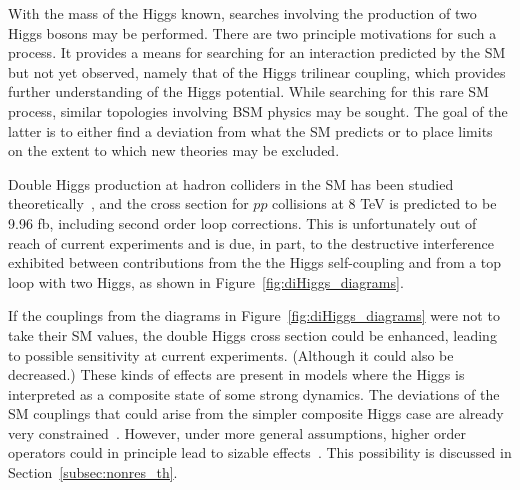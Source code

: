With the mass of the Higgs known, searches involving the production of two Higgs bosons may
be performed. There are two principle motivations for such a process.
It provides a means for searching for an interaction predicted by the SM but not yet observed,
namely that
of the Higgs trilinear coupling, which provides further understanding of the Higgs potential.
While searching for this rare SM process, similar topologies involving BSM physics may
be sought. The goal of the latter is to either find a deviation from what the SM predicts
or to place limits on the extent to which new theories may be excluded.

Double Higgs production at hadron colliders in the SM has been studied
theoretically~\cite{Baglio:2012np,Plehn:1996wb}, and the cross section for $pp$ collisions at 8 TeV
is predicted to be 9.96 fb, including second order loop corrections.
This is unfortunately out of reach of current
experiments and is due, in part, to the destructive interference exhibited between contributions
from the the Higgs self-coupling and from a top loop with two Higgs, as shown in
Figure~\ref{fig:diHiggs_diagrams}.

If the couplings from the diagrams in Figure~\ref{fig:diHiggs_diagrams} were not to take their SM
values, the double Higgs cross section could be enhanced, leading to possible sensitivity
at current experiments. (Although it could also be decreased.)
These kinds of effects are present in models
where the Higgs is interpreted as a composite state of some strong dynamics. The deviations
of the SM couplings that could arise from the simpler composite Higgs case are
already very constrained~\cite{Ellis:2013ywa,Ellis:2013lra}.
However, under more general assumptions, higher order
operators could in principle lead to sizable effects~\cite{Belyaev:1999mx,Dib:2005re,Oliveira:2010uv}.
This possibility is discussed in Section~\ref{subsec:nonres_th}.

